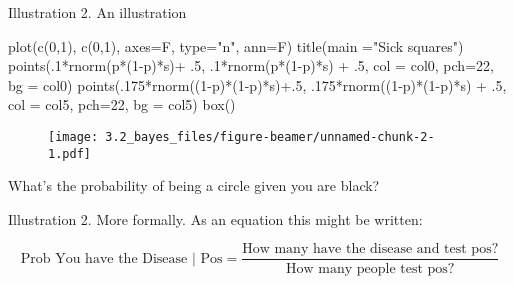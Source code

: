 \documentclass[
  11pt,
  ignorenonframetext,
]{beamer}
\newenvironment{Shaded}{\begin{snugshade}}{\end{snugshade}}
\newcommand{\AttributeTok}[1]{\textcolor[rgb]{0.40,0.45,0.13}{#1}}
\newcommand{\DecValTok}[1]{\textcolor[rgb]{0.68,0.00,0.00}{#1}}
\newcommand{\FunctionTok}[1]{\textcolor[rgb]{0.28,0.35,0.67}{#1}}
\newcommand{\NormalTok}[1]{\textcolor[rgb]{0.00,0.23,0.31}{#1}}
\newcommand{\SpecialCharTok}[1]{\textcolor[rgb]{0.37,0.37,0.37}{#1}}
\newcommand{\StringTok}[1]{\textcolor[rgb]{0.13,0.47,0.30}{#1}}
\begin{document}
\begin{frame}[fragile]{Illustration 2. An illustration}
\begin{Shaded}
\begin{Highlighting}[]
    \FunctionTok{plot}\NormalTok{(}\FunctionTok{c}\NormalTok{(}\DecValTok{0}\NormalTok{,}\DecValTok{1}\NormalTok{), }\FunctionTok{c}\NormalTok{(}\DecValTok{0}\NormalTok{,}\DecValTok{1}\NormalTok{), }\AttributeTok{axes=}\NormalTok{F, }\AttributeTok{type=}\StringTok{"n"}\NormalTok{, }\AttributeTok{ann=}\NormalTok{F)}
    \FunctionTok{title}\NormalTok{(}\AttributeTok{main =}\StringTok{"Sick squares"}\NormalTok{)}
    \FunctionTok{points}\NormalTok{(.}\DecValTok{1}\SpecialCharTok{*}\FunctionTok{rnorm}\NormalTok{(p}\SpecialCharTok{*}\NormalTok{(}\DecValTok{1}\SpecialCharTok{{-}}\NormalTok{p)}\SpecialCharTok{*}\NormalTok{s)}\SpecialCharTok{+}\NormalTok{ .}\DecValTok{5}\NormalTok{, .}\DecValTok{1}\SpecialCharTok{*}\FunctionTok{rnorm}\NormalTok{(p}\SpecialCharTok{*}\NormalTok{(}\DecValTok{1}\SpecialCharTok{{-}}\NormalTok{p)}\SpecialCharTok{*}\NormalTok{s) }\SpecialCharTok{+}\NormalTok{ .}\DecValTok{5}\NormalTok{, }\AttributeTok{col =}\NormalTok{ col0, }\AttributeTok{pch=}\DecValTok{22}\NormalTok{, }\AttributeTok{bg =}\NormalTok{ col0)}
    \FunctionTok{points}\NormalTok{(.}\DecValTok{175}\SpecialCharTok{*}\FunctionTok{rnorm}\NormalTok{((}\DecValTok{1}\SpecialCharTok{{-}}\NormalTok{p)}\SpecialCharTok{*}\NormalTok{(}\DecValTok{1}\SpecialCharTok{{-}}\NormalTok{p)}\SpecialCharTok{*}\NormalTok{s)}\SpecialCharTok{+}\NormalTok{.}\DecValTok{5}\NormalTok{, .}\DecValTok{175}\SpecialCharTok{*}\FunctionTok{rnorm}\NormalTok{((}\DecValTok{1}\SpecialCharTok{{-}}\NormalTok{p)}\SpecialCharTok{*}\NormalTok{(}\DecValTok{1}\SpecialCharTok{{-}}\NormalTok{p)}\SpecialCharTok{*}\NormalTok{s) }\SpecialCharTok{+}\NormalTok{ .}\DecValTok{5}\NormalTok{, }\AttributeTok{col =}\NormalTok{ col5, }\AttributeTok{pch=}\DecValTok{22}\NormalTok{, }\AttributeTok{bg =}\NormalTok{ col5) }
    \FunctionTok{box}\NormalTok{()}
\end{Highlighting}
\end{Shaded}

\begin{figure}

{\centering \texttt{[image: 3.2\_bayes\_files/figure-beamer/unnamed-chunk-2-1.pdf]}

}

\end{figure}

What's the probability of being a circle given you are black?
\end{frame}

\begin{frame}{Illustration 2. More formally.}
\protect\hypertarget{illustration-2.-more-formally.}{}
As an equation this might be written:

\[\text{Prob You have the Disease | Pos} = \frac{\text{How many have the disease and test pos?}}{\text{How many people test pos?}}\]
\end{frame}
\end{document}
